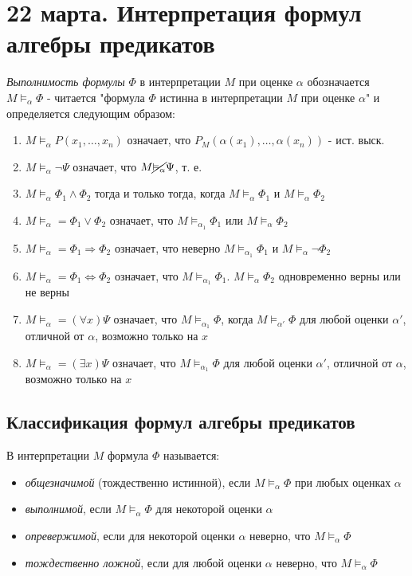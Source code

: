 \chapter{22 марта. Интерпретация формул алгебры предикатов}


{\it Выполнимость формулы} $\Phi$ в интерпретации $M$ при оценке $\alpha$ обозначается $M \vDash_\alpha \Phi$ - читается "формула $\Phi$ истинна в интерпретации $M$ при оценке $\alpha$" и определяется следующим образом:
\begin{enumerate}
    \item $M \vDash_\alpha P(x_1, \dots, x_n)$ означает, что $P_M(\alpha(x_1), \dots, \alpha(x_n))$ - ист. выск.
    \item $M \vDash_\alpha \neg \Psi$ означает, что $M \cancel{\vDash_\alpha} \Psi$, т. е.
    \item $M \vDash_\alpha \Phi_1 \land \Phi_2$ тогда и только тогда, когда $M \vDash_\alpha \Phi_1$ и $M \vDash_\alpha \Phi_2$
    \item $M \vDash_\alpha = \Phi_1 \lor \Phi_2$ означает, что $M \vDash_{\alpha_1} \Phi_1$ или $M \vDash_\alpha \Phi_2$
    \item $M \vDash_\alpha = \Phi_1 \Rightarrow \Phi_2$ означает, что неверно $M \vDash_{\alpha_1} \Phi_1$ и $M \vDash_\alpha \lnot \Phi_2$
    \item $M \vDash_\alpha = \Phi_1 \Leftrightarrow \Phi_2$ означает, что $M \vDash_{\alpha_1} \Phi_1$. $M \vDash_\alpha \Phi_2$ одновременно верны или не верны
    \item $M \vDash_\alpha = (\forall x)\Psi$ означает, что $M \vDash_{\alpha_1} \Phi$, когда $M \vDash_{\alpha'} \Phi$ для любой оценки $\alpha'$, отличной от $\alpha$, возможно только на $x$
    \item $M \vDash_\alpha = (\exists x)\Psi$ означает, что $M \vDash_{\alpha_1} \Phi$ для любой оценки $\alpha'$, отличной от $\alpha$, возможно только на $x$
\end{enumerate}

\section{Классификация формул алгебры предикатов}


\dftion В интерпретации $M$ формула $\Phi$ называется:
\begin{itemize}
    \item {\it общезначимой} (тождественно истинной), если $M \vDash_\alpha \Phi$ при любых оценках $\alpha$
    \item {\it выполнимой}, если $M \vDash_\alpha \Phi$ для некоторой оценки $\alpha$
    \item {\it опревержимой}, если для некоторой оценки $\alpha$ неверно, что $M \vDash_\alpha \Phi$
    \item {\it тождественно ложной}, если для любой оценки $\alpha$ неверно, что $M \vDash_\alpha \Phi$
\end{itemize}


